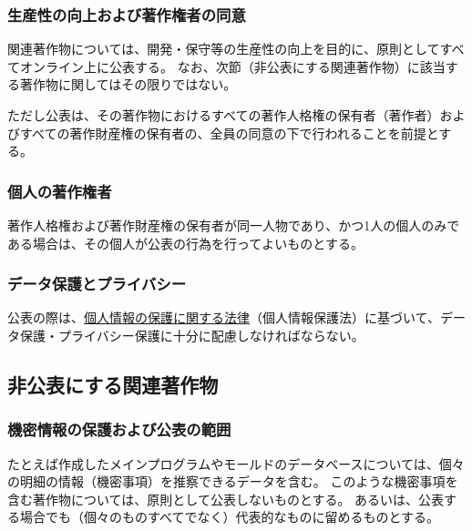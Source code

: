 \subsubsection{生産性の向上および著作権者の同意}
関連著作物については、開発・保守等の生産性の向上を目的に、原則としてすべてオンライン上に公表する。
なお、次節（非公表にする関連著作物）に該当する著作物に関してはその限りではない。

ただし公表は、その著作物におけるすべての著作人格権の保有者（著作者）およびすべての著作財産権の保有者の、全員の同意の下で行われることを前提とする。


\subsubsection{個人の著作権者\label{subsec:individualholder}}
著作人格権および著作財産権の保有者が同一人物であり、かつ1人の個人のみである場合は、その個人が公表の行為を行ってよいものとする。

\subsubsection{データ保護とプライバシー}
公表の際は、\href{https://elaws.e-gov.go.jp/document?lawid=415AC0000000057}{個人情報の保護に関する法律}（個人情報保護法）\cite{eGovPersonalInfoProtectionLaw}に基づいて、データ保護・プライバシー保護に十分に配慮しなければならない。


\subsection{非公表にする関連著作物}

\subsubsection{機密情報の保護および公表の範囲\label{subsec:notopenwork}}
たとえば作成したメインプログラムやモールドのデータベースについては、個々の明細の情報（機密事項）を推察できるデータを含む。
このような機密事項を含む著作物については、原則として公表しないものとする。
あるいは、公表する場合でも（個々のものすべてでなく）代表的なものに留めるものとする。

